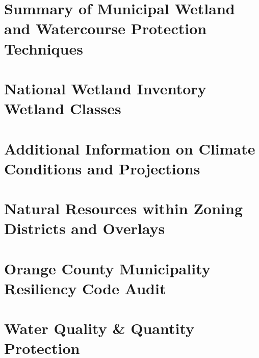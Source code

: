 \documentclass[11pt,fleqn, openany]{book} %
\begin{document}
\chapter{Summary of Municipal Wetland and Watercourse Protection Techniques}
\label{app:wetland_protection}

\chapter{National Wetland Inventory Wetland Classes}
\label{app:cornwall_wetlands}

\chapter{Additional Information on Climate Conditions and Projections}
\label{app:climate_projection}

\chapter{Natural Resources within Zoning Districts and Overlays}
\label{app:zoning}

\chapter{Orange County Municipality Resiliency Code Audit}
\label{app:oc_resiliency}

\chapter{Water Quality \& Quantity Protection}
\label{app:water_quality}


\end{document}
